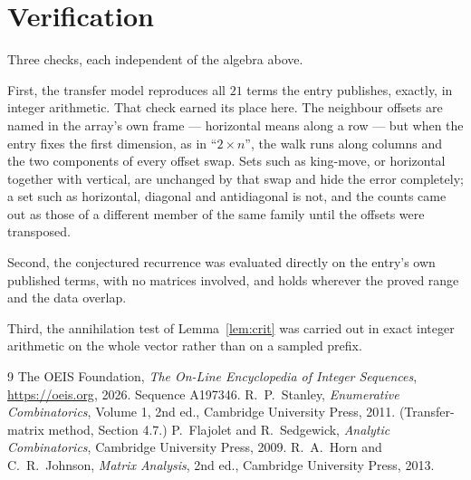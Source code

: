 \documentclass[11pt,a4paper]{article}
\theoremstyle{plain}
\theoremstyle{definition}
\begin{document}
\section{Verification}

Three checks, each independent of the algebra above.

First, the transfer model reproduces all $21$ terms the entry publishes, exactly, in
integer arithmetic. That check earned its place here. The neighbour offsets are named in the
array's own frame --- horizontal means along a row --- but when the entry fixes the first
dimension, as in ``$2\times n$'', the walk runs along columns and the two components of every
offset swap. Sets such as king-move, or horizontal together with vertical, are unchanged by
that swap and hide the error completely; a set such as horizontal, diagonal and antidiagonal
is not, and the counts came out as those of a different member of the same family until the
offsets were transposed.

Second, the conjectured recurrence was evaluated directly on the entry's own published terms,
with no matrices involved, and holds wherever the proved range and the data overlap.

Third, the annihilation test of Lemma~\ref{lem:crit} was carried out in exact integer
arithmetic on the whole vector rather than on a sampled prefix.

\begin{thebibliography}{9}
 The OEIS Foundation, \emph{The On-Line Encyclopedia of Integer
Sequences}, \url{https://oeis.org}, 2026. Sequence A197346.
 R.~P.~Stanley, \emph{Enumerative Combinatorics}, Volume 1, 2nd ed.,
Cambridge University Press, 2011. (Transfer-matrix method, Section 4.7.)
 P.~Flajolet and R.~Sedgewick, \emph{Analytic Combinatorics}, Cambridge
University Press, 2009.
 R.~A.~Horn and C.~R.~Johnson, \emph{Matrix Analysis}, 2nd ed., Cambridge
University Press, 2013.
\end{thebibliography}
\end{document}
